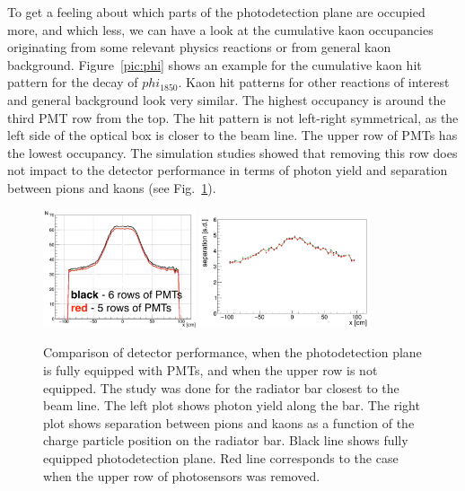 \documentclass[11pt, a4paper]{article}
\begin{document}
To get a feeling about which parts of the photodetection plane are occupied more, and which less, we can have a look at the cumulative kaon occupancies originating from some relevant physics reactions or from general kaon background. Figure~\ref{pic:phi} shows an example for the cumulative kaon hit pattern for the decay of $phi_{1850}$. Kaon hit patterns for other reactions of interest and general background look very similar. The highest occupancy is around the third PMT row from the top. The hit pattern is not left-right symmetrical, as the left side of the optical box is closer to the beam line. The upper row of PMTs has the lowest occupancy. The simulation studies showed that removing this row does not impact to the detector performance in terms of photon yield and separation between pions and kaons (see Fig.~\ref{pic:5rows}).

\begin{figure}[!h]
\centering
\includegraphics[angle=0,width=0.4\textwidth]{pics/5rows1.png} \hspace{0.5cm} \includegraphics[width=0.45\textwidth]{pics/5rows2.png}
\caption{\label{pic:5rows}
Comparison of detector performance, when the photodetection plane is fully equipped with PMTs, and when the upper row is not equipped. The study was done for the radiator bar closest to the beam line. The left plot shows photon yield along the bar. The right plot shows separation between pions and kaons as a function of the charge particle position on the radiator bar. Black line shows fully equipped photodetection plane. Red line corresponds to the case when the upper row of photosensors was removed.
}
\end{figure}
\end{document}
